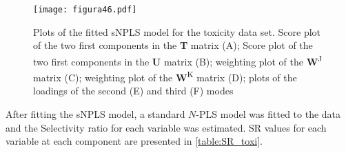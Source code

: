 \begin{figure}[hbtp]
	\centering
\texttt{[image: figura46.pdf]}
\caption[Plots of the fitted sNPLS model for the toxicity data set]{Plots of the fitted sNPLS model for the toxicity data set. Score plot of the two first components in the \textbf{T} matrix (A); Score plot of the two first components in the \textbf{U} matrix (B); weighting plot of the \textbf{W}\textsuperscript{J} matrix (C); weighting plot of the \textbf{W}\textsuperscript{K} matrix (D); plots of the loadings of the second (E) and third (F) modes}
\label{figura46}
\end{figure}

After fitting the sNPLS model, a standard $N$-PLS model was fitted to the data and the Selectivity ratio for each variable was estimated. SR values for each variable at each component are presented in \autoref{table:SR_toxi}.

